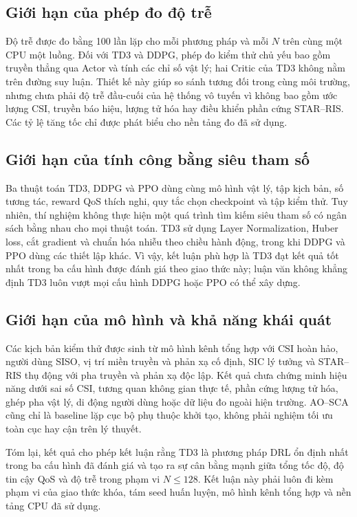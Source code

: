 \subsection{Giới hạn của phép đo độ trễ}

Độ trễ được đo bằng 100 lần lặp cho mỗi phương pháp và mỗi $N$ trên cùng một CPU một luồng. Đối với TD3 và DDPG, phép đo kiểm thử chủ yếu bao gồm truyền thẳng qua Actor và tính các chỉ số vật lý; hai Critic của TD3 không nằm trên đường suy luận. Thiết kế này giúp so sánh tương đối trong cùng môi trường, nhưng chưa phải độ trễ đầu-cuối của hệ thống vô tuyến vì không bao gồm ước lượng CSI, truyền báo hiệu, lượng tử hóa hay điều khiển phần cứng STAR--RIS. Các tỷ lệ tăng tốc chỉ được phát biểu cho nền tảng đo đã sử dụng.

\subsection{Giới hạn của tính công bằng siêu tham số}

Ba thuật toán TD3, DDPG và PPO dùng cùng mô hình vật lý, tập kịch bản, số tương tác, reward QoS thích nghi, quy tắc chọn checkpoint và tập kiểm thử. Tuy nhiên, thí nghiệm không thực hiện một quá trình tìm kiếm siêu tham số có ngân sách bằng nhau cho mọi thuật toán. TD3 sử dụng Layer Normalization, Huber loss, cắt gradient và chuẩn hóa nhiễu theo chiều hành động, trong khi DDPG và PPO dùng các thiết lập khác. Vì vậy, kết luận phù hợp là TD3 đạt kết quả tốt nhất trong ba cấu hình được đánh giá theo giao thức này; luận văn không khẳng định TD3 luôn vượt mọi cấu hình DDPG hoặc PPO có thể xây dựng.

\subsection{Giới hạn của mô hình và khả năng khái quát}

Các kịch bản kiểm thử được sinh từ mô hình kênh tổng hợp với CSI hoàn hảo, người dùng SISO, vị trí miền truyền và phản xạ cố định, SIC lý tưởng và STAR--RIS thụ động với pha truyền và phản xạ độc lập. Kết quả chưa chứng minh hiệu năng dưới sai số CSI, tương quan không gian thực tế, phần cứng lượng tử hóa, ghép pha vật lý, di động người dùng hoặc dữ liệu đo ngoài hiện trường. AO--SCA cũng chỉ là baseline lặp cục bộ phụ thuộc khởi tạo, không phải nghiệm tối ưu toàn cục hay cận trên lý thuyết.

Tóm lại, kết quả cho phép kết luận rằng TD3 là phương pháp DRL ổn định nhất trong ba cấu hình đã đánh giá và tạo ra sự cân bằng mạnh giữa tổng tốc độ, độ tin cậy QoS và độ trễ trong phạm vi $N\le128$. Kết luận này phải luôn đi kèm phạm vi của giao thức khóa, tám seed huấn luyện, mô hình kênh tổng hợp và nền tảng CPU đã sử dụng.
